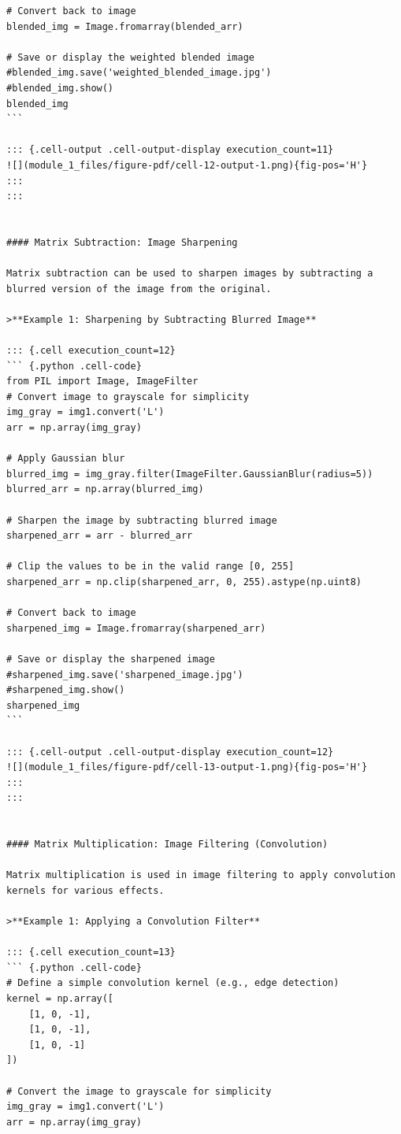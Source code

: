 \documentclass[
  letterpaper,
  DIV=11,
  numbers=noendperiod]{scrreprt}
\theoremstyle{plain}
\theoremstyle{definition}
\theoremstyle{remark}
\begin{document}
\begin{verbatim}
# Convert back to image
blended_img = Image.fromarray(blended_arr)

# Save or display the weighted blended image
#blended_img.save('weighted_blended_image.jpg')
#blended_img.show()
blended_img
```

::: {.cell-output .cell-output-display execution_count=11}
![](module_1_files/figure-pdf/cell-12-output-1.png){fig-pos='H'}
:::
:::


#### Matrix Subtraction: Image Sharpening

Matrix subtraction can be used to sharpen images by subtracting a blurred version of the image from the original.

>**Example 1: Sharpening by Subtracting Blurred Image**

::: {.cell execution_count=12}
``` {.python .cell-code}
from PIL import Image, ImageFilter
# Convert image to grayscale for simplicity
img_gray = img1.convert('L')
arr = np.array(img_gray)

# Apply Gaussian blur
blurred_img = img_gray.filter(ImageFilter.GaussianBlur(radius=5))
blurred_arr = np.array(blurred_img)

# Sharpen the image by subtracting blurred image
sharpened_arr = arr - blurred_arr

# Clip the values to be in the valid range [0, 255]
sharpened_arr = np.clip(sharpened_arr, 0, 255).astype(np.uint8)

# Convert back to image
sharpened_img = Image.fromarray(sharpened_arr)

# Save or display the sharpened image
#sharpened_img.save('sharpened_image.jpg')
#sharpened_img.show()
sharpened_img
```

::: {.cell-output .cell-output-display execution_count=12}
![](module_1_files/figure-pdf/cell-13-output-1.png){fig-pos='H'}
:::
:::


#### Matrix Multiplication: Image Filtering (Convolution)

Matrix multiplication is used in image filtering to apply convolution kernels for various effects.

>**Example 1: Applying a Convolution Filter**

::: {.cell execution_count=13}
``` {.python .cell-code}
# Define a simple convolution kernel (e.g., edge detection)
kernel = np.array([
    [1, 0, -1],
    [1, 0, -1],
    [1, 0, -1]
])

# Convert the image to grayscale for simplicity
img_gray = img1.convert('L')
arr = np.array(img_gray)


\end{verbatim}
\end{document}
